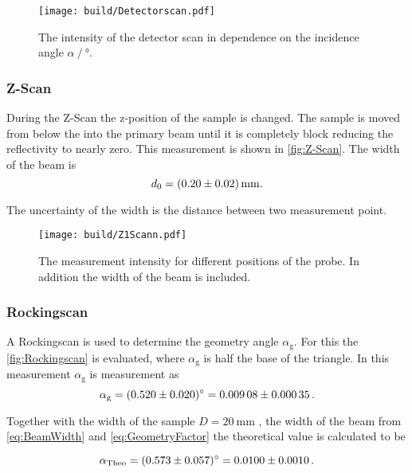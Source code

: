 \begin{figure}[H]
    \centering
    \texttt{[image: build/Detectorscan.pdf]}
    \caption{The intensity of the detector scan in dependence on the incidence angle $\alpha \mathbin{/} \unit{\degree}$.}
    \label{fig:Detectorscan}
\end{figure}

\subsubsection{Z-Scan}

During the Z-Scan the z-position of the sample is changed. 
The sample is moved from below the into the primary beam until it is completely block reducing the reflectivity to nearly zero.
This measurement is shown in \autoref{fig:Z-Scan}.
The width of the beam is 
\begin{equation*}
    d_0 = \SI{0.20 \pm 0.02}{\milli\meter}.
    \label{eq:BeamWidth}
\end{equation*}

The uncertainty of the width is the distance between two measurement point.

\begin{figure}[H]
    \centering
    \texttt{[image: build/Z1Scann.pdf]}
    \caption{The measurement intensity for different positions of the probe. In addition the width of the beam is included.} 
    \label{fig:Z-Scan}
\end{figure}



\subsubsection{Rockingscan}

A Rockingscan is used to determine the geometry angle $\alpha_\text{g}$. 
For this the \autoref{fig:Rockingscan} is evaluated, where $\alpha_\text{g}$ is half the base of the triangle.
In this measurement $\alpha_\text{g}$ is measurement as 
\begin{equation*}
    \alpha_\text{g} = \SI{0.520 \pm 0.020}{\degree} = \num{0.00908 \pm 0.00035}\,.
\end{equation*}

Together with the width of the sample $D = \SI{20}{\milli\meter}$ \cite{v44}, the width of the beam from \autoref{eq:BeamWidth} and \autoref{eq:GeometryFactor} the theoretical value is calculated to be 

\begin{equation*}
    \alpha_\text{Theo}  = \SI{0.573 \pm 0.057}{\degree} = \num{0.0100 \pm 0.0010}\,.
\end{equation*}



